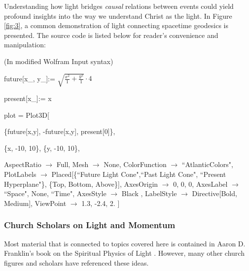 \documentclass{article}
\begin{document}
                    Understanding how light bridges \emph{causal} relations between events could yield profound insights into the way we understand Christ as the light.
                    In Figure \ref{fig:3}, a common demonstration of light connecting spacetime geodesics is presented. The source code is listed below for reader's convenience and manipulation:
                    
                    \begin{center}
                        (In modified Wolfram Input syntax)
                    \end{center}
                        future[x\_, y\_]:= $\sqrt{\tfrac{x^2}{1} + \tfrac{y^2}{1}} \cdot 4$
                        
                        present[x\_]:= x

                        plot = Plot3D[
                            
                        \{future[x,y], -future[x,y], present[0]\}, 
                        
                        \{x, -10, 10\}, \{y, -10, 10\},

                        AspectRatio $\rightarrow$ Full, Mesh $\rightarrow$ None, ColorFunction $\rightarrow$ ``AtlanticColors", 
                        PlotLabels $\rightarrow$ Placed[\{``Future Light Cone",``Past Light Cone", ``Present Hyperplane"\}, \{Top, Bottom, Above\}], 
                        AxesOrigin $\rightarrow$ {0, 0, 0}, AxesLabel $\rightarrow$ {``Space", None, ``Time"}, 
                        AxesStyle $\rightarrow$ Black , LabelStyle $\rightarrow$ Directive[Bold, Medium], 
                        ViewPoint $\rightarrow$ {1.3, -2.4, 2.}
                        ]

                \subsubsection{Church Scholars on Light and Momentum}
                    Most material that is connected to topics covered here is contained in Aaron D. Franklin's book on the Spiritual Physics of Light \cite{Franklin}. 
                    However, many other church figures and scholars have referenced these ideas.
\end{document}
